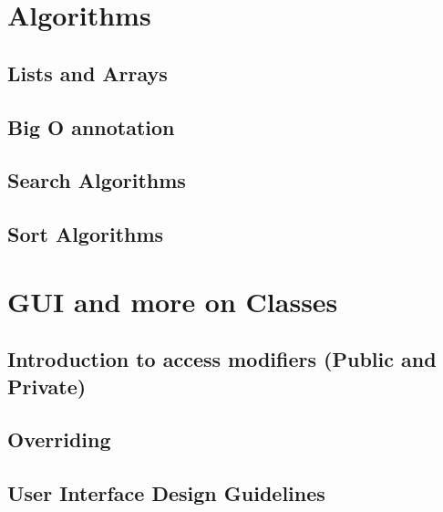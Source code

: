 \documentclass[
]{book}
\begin{document}
\hypertarget{algorithms}{%
\chapter{Algorithms}\label{algorithms}}

\hypertarget{lists-and-arrays}{%
\section{Lists and Arrays}\label{lists-and-arrays}}

\hypertarget{big-o-annotation}{%
\section{Big O annotation}\label{big-o-annotation}}

\hypertarget{search-algorithms}{%
\section{Search Algorithms}\label{search-algorithms}}

\hypertarget{sort-algorithms}{%
\section{Sort Algorithms}\label{sort-algorithms}}

\hypertarget{gui-and-more-on-classes}{%
\chapter{GUI and more on Classes}\label{gui-and-more-on-classes}}

\hypertarget{introduction-to-access-modifiers-public-and-private}{%
\section{Introduction to access modifiers (Public and Private)}\label{introduction-to-access-modifiers-public-and-private}}

\hypertarget{overriding}{%
\section{Overriding}\label{overriding}}

\hypertarget{user-interface-design-guidelines}{%
\section{User Interface Design Guidelines}\label{user-interface-design-guidelines}}
\end{document}
